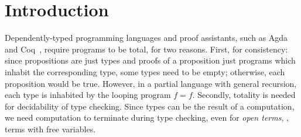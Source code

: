 \documentclass[acmsmall,screen]{acmart}\settopmatter{}
\begin{document}




\maketitle


\section{Introduction}
\label{sec:intro}



Dependently-typed programming languages and proof assistants, such as Agda~\citeyearpar{agdawiki} and Coq~\cite{inria:coq86}, require programs to be total, for two reasons.  First, for consistency:  since propositions are just types and proofs of a proposition just programs which inhabit the corresponding type, some types need to be empty; otherwise, each proposition would be true.  However, in a partial language with general recursion, each type is inhabited by the looping program $f = f$.  Secondly, totality is needed for decidability of type checking.  Since types can be the result of a computation, we need computation to terminate during type checking, even for \emph{open terms}, \ie, terms with free variables.
\end{document}
